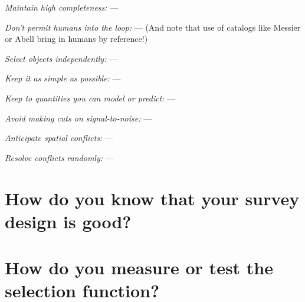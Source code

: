 \documentclass[modern]{aastex62}
\renewcommand{\paragraph}[1]{\smallskip\noindent\textit{#1} --- }
\begin{document}
\paragraph{Maintain high completeness:}

\paragraph{Don't permit humans into the loop:}
(And note that use of catalogs like Messier or Abell bring in humans
by reference!)

\paragraph{Select objects independently:}

\paragraph{Keep it as simple as possible:}

\paragraph{Keep to quantities you can model or predict:}

\paragraph{Avoid making cuts on signal-to-noise:}

\paragraph{Anticipate spatial conflicts:}

\paragraph{Resolve conflicts randomly:}

\section{How do you know that your survey design is good?}\label{sec:verify}

\section{How do you measure or test the selection function?}\label{sec:estimate}
\end{document}
